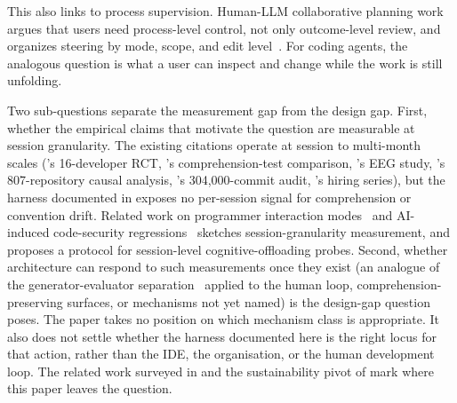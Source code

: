 This also links to process supervision. Human-LLM collaborative planning work argues that users need process-level control, not only outcome-level review, and organizes steering by mode, scope, and edit level~\citep{he2026steer}. For coding agents, the analogous question is what a user can inspect and change while the work is still unfolding.

Two sub-questions separate the measurement gap from the design gap. First, whether the empirical claims that motivate the question are measurable at session granularity. The existing citations operate at session to multi-month scales (\citet{becker2025measuring}'s 16-developer RCT, \citet{shen2026skill}'s comprehension-test comparison, \citet{kosmyna2025brain}'s EEG study, \citet{he2026cursor}'s 807-repository causal analysis, \citet{liu2026techdebt}'s 304{,}000-commit audit, \citet{rak2025aihiring}'s hiring series), but the harness documented in  exposes no per-session signal for comprehension or convention drift. Related work on programmer interaction modes~\citep{barke2023groundedcopilot} and AI-induced code-security regressions~\citep{perry2023insecurecode} sketches session-granularity measurement, and \citet{aiersilan2026vibecheck} proposes a protocol for session-level cognitive-offloading probes. Second, whether architecture can respond to such measurements once they exist (an analogue of the generator-evaluator separation~\citep{anthropic2026harness} applied to the human loop, comprehension-preserving surfaces, or mechanisms not yet named) is the design-gap question  poses. The paper takes no position on which mechanism class is appropriate. It also does not settle whether the harness documented here is the right locus for that action, rather than the IDE, the organisation, or the human development loop. The related work surveyed in  and the sustainability pivot of  mark where this paper leaves the question.
